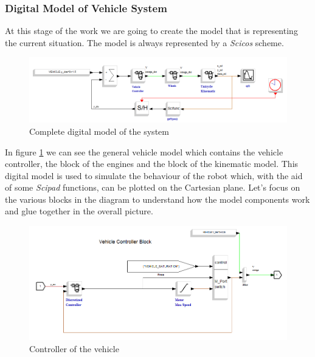 \subsubsection{Digital Model of Vehicle System}

At this stage of the work we are going to create the model that is representing the current situation. The model is always represented by a \textit{Scicos} scheme.

\begin{figure}[H]
  \begin{center}
  \includegraphics[scale=0.51]{FIGURES_3/Whole_Vehicle.png}
    \caption[]{Complete digital model of the system}
    \label{fig:rlVehicle1}
  \end{center}
\end{figure}

In figure \ref{fig:rlVehicle1} we can see the general vehicle model which contains the vehicle controller, the block of the engines and the block of the kinematic model. This digital model is used to simulate the behaviour of the robot which, with the aid of some \textit{Scipad} functions, can be plotted on the Cartesian plane.
Let's focus on the various blocks in the diagram to understand how the model components work and glue together in the overall picture.

\begin{figure}[H]
  \begin{center}
  \includegraphics[scale=0.49]{FIGURES_3/Vehicle_Controller.png}
    \caption[]{Controller of the vehicle}
    \label{fig:rlVehicle2}
  \end{center}
\end{figure}

